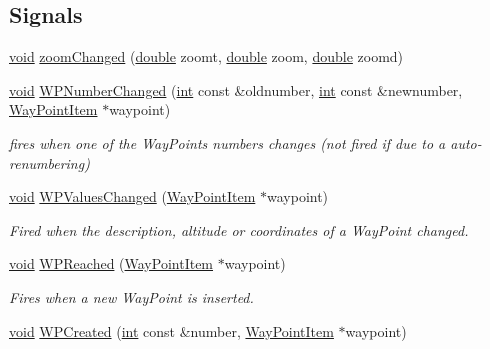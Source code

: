 \subsection*{Signals}
\begin{DoxyCompactItemize}
\item 
\hyperlink{group___u_a_v_objects_plugin_ga444cf2ff3f0ecbe028adce838d373f5c}{void} \hyperlink{group___o_p_map_widget_ga5f82149d3970603013155e5ace73c085}{zoom\-Changed} (\hyperlink{_super_l_u_support_8h_a8956b2b9f49bf918deed98379d159ca7}{double} zoomt, \hyperlink{_super_l_u_support_8h_a8956b2b9f49bf918deed98379d159ca7}{double} zoom, \hyperlink{_super_l_u_support_8h_a8956b2b9f49bf918deed98379d159ca7}{double} zoomd)
\item 
\hyperlink{group___u_a_v_objects_plugin_ga444cf2ff3f0ecbe028adce838d373f5c}{void} \hyperlink{group___o_p_map_widget_gad5aa3c5dba212fe3975e483da178f16c}{W\-P\-Number\-Changed} (\hyperlink{ioapi_8h_a787fa3cf048117ba7123753c1e74fcd6}{int} const \&oldnumber, \hyperlink{ioapi_8h_a787fa3cf048117ba7123753c1e74fcd6}{int} const \&newnumber, \hyperlink{classmapcontrol_1_1_way_point_item}{Way\-Point\-Item} $\ast$waypoint)
\begin{DoxyCompactList}\small\item\em fires when one of the Way\-Points numbers changes (not fired if due to a auto-\/renumbering) \end{DoxyCompactList}\item 
\hyperlink{group___u_a_v_objects_plugin_ga444cf2ff3f0ecbe028adce838d373f5c}{void} \hyperlink{group___o_p_map_widget_ga7b05d6d31a9d3dc1fb1bf4d581884f77}{W\-P\-Values\-Changed} (\hyperlink{classmapcontrol_1_1_way_point_item}{Way\-Point\-Item} $\ast$waypoint)
\begin{DoxyCompactList}\small\item\em Fired when the description, altitude or coordinates of a Way\-Point changed. \end{DoxyCompactList}\item 
\hyperlink{group___u_a_v_objects_plugin_ga444cf2ff3f0ecbe028adce838d373f5c}{void} \hyperlink{group___o_p_map_widget_gace0e66a97e422c30b79aed508d0be81d}{W\-P\-Reached} (\hyperlink{classmapcontrol_1_1_way_point_item}{Way\-Point\-Item} $\ast$waypoint)
\begin{DoxyCompactList}\small\item\em Fires when a new Way\-Point is inserted. \end{DoxyCompactList}\item 
\hyperlink{group___u_a_v_objects_plugin_ga444cf2ff3f0ecbe028adce838d373f5c}{void} \hyperlink{group___o_p_map_widget_ga76a7138d7fd9e231e80d00430c349d03}{W\-P\-Created} (\hyperlink{ioapi_8h_a787fa3cf048117ba7123753c1e74fcd6}{int} const \&number, \hyperlink{classmapcontrol_1_1_way_point_item}{Way\-Point\-Item} $\ast$waypoint)

\end{DoxyCompactItemize}
